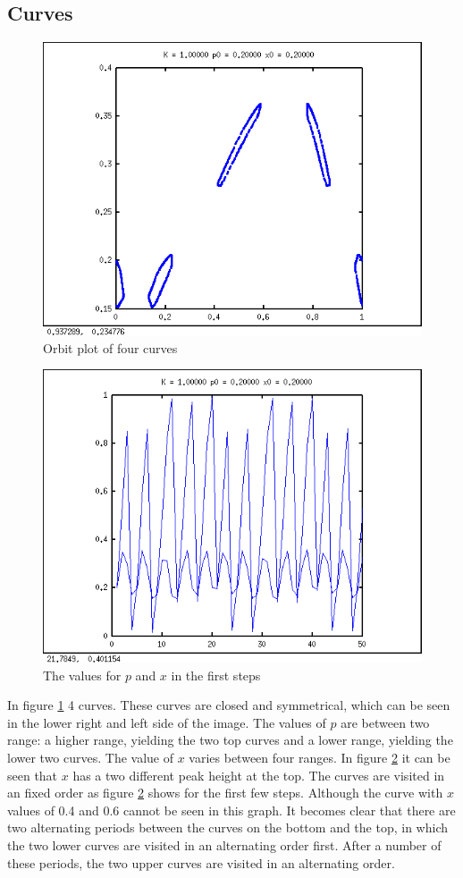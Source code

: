 \documentclass[a4paper,11pt]{article}
\begin{document}
\subsection*{Curves}
\begin{figure}[H]
\centering
\includegraphics[width=.8\textwidth]{curvesorbit.png}
\caption{Orbit plot of four curves}
\label{curveorbit}
\end{figure}
\begin{figure}[H]
\centering
\includegraphics[width=.8\textwidth]{curvesvalues.png}
\caption{The values for $p$ and $x$ in the first steps }
\label{curveval}
\end{figure}

\newpage

In figure \ref{curveorbit} 4 curves. These curves are closed and symmetrical, which can be seen in the lower right and left side of the image.  The values of $p$ are between two range: a higher range, yielding the two top curves and a lower range, yielding the lower two curves. The value of $x$ varies between four ranges. In figure \ref{curveval} it can be seen that $x$ has a two different peak height at the top. The curves are visited in an fixed order as figure \ref{curveval} shows for the first few steps. Although the curve with $x$ values of 0.4 and 0.6 cannot be seen in this graph. It becomes clear that there are two alternating periods between the curves on the bottom and the top, in which the two lower curves are visited in an alternating order first. After a number of these periods, the two upper curves are visited in an alternating order.
\end{document}
